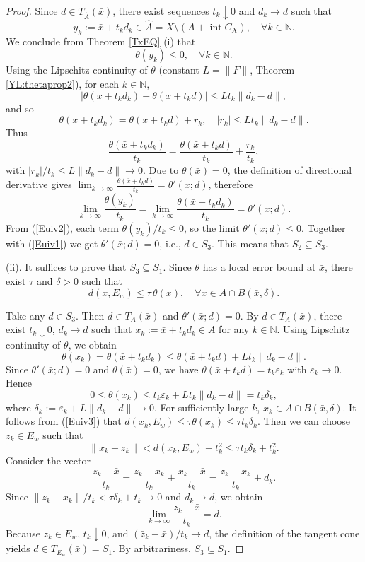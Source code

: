 \documentclass[11pt]{article}
\begin{document}
\begin{proof}
Since $d\in T_{\widehat{A}}(\bar{x})$, there exist sequences $t_k\downarrow0$ and $d_k\to d$ such that
\[
y_k:=\bar{x}+t_k d_k\in\widehat{A}=X\setminus(A+\operatorname{int}C_X), \quad  \forall k \in \mathbb{N}.
\]
    We conclude from  Theorem  \ref{TxEQ} (i)  that
\begin{equation}\label{Euiv2}
\theta(y_k)\le 0,  \quad  \forall k \in \mathbb{N}.
\end{equation}
Using the   Lipschitz continuity of $\theta$ (constant $L=\|F\|$, Theorem \ref{YL:thetaprop2}), for each $k \in \mathbb{N}$,
\[
|\theta(\bar{x}+t_k d_k)-\theta(\bar{x}+t_k d)|\le L t_k\|d_k-d\|,
\]
and so
\[
\theta(\bar{x}+t_k d_k)=\theta(\bar{x}+t_k d)+r_k,\quad |r_k|\le L t_k\|d_k-d\|.
\]
Thus
\[
\frac{\theta(\bar{x}+t_k d_k)}{t_k}=\frac{\theta(\bar{x}+t_k d)}{t_k}+\frac{r_k}{t_k},
\]
with $|r_k|/t_k\le L\|d_k-d\|\to0$.   Due to  $\theta(\bar{x})=0$,   the definition of directional derivative gives $\lim_{k\to\infty}\frac{\theta(\bar{x}+t_k d)}{t_k}=\theta'(\bar{x};d)$, therefore
\[
\lim_{k\to\infty}\frac{\theta(y_k)}{t_k}=\lim_{k\to\infty}\frac{\theta(\bar{x}+t_k d_k)}{t_k}=\theta'(\bar{x};d).
\]
From (\ref{Euiv2}), each term $\theta(y_k)/t_k\le0$, so the limit $\theta'(\bar{x};d)\le0$. Together with (\ref{Euiv1}) we get $\theta'(\bar{x};d)=0$, i.e., $d\in S_3$.  This means that $S_2\subseteq S_3$.

 

(ii).         It suffices to prove  that   $S_3\subseteq S_1$.      Since $\theta$ has a local error bound at   $\bar x$,   there exist $\tau$ and $\delta>0$ such that
\begin{equation}\label{Euiv3}
d(x,E_w)\le \tau\,\theta(x),\quad\forall x\in A\cap B(\bar{x},\delta).
\end{equation}




Take any $d\in S_3$. Then $d\in T_A(\bar{x})$ and $\theta'(\bar{x};d)=0$.
By $d\in T_A(\bar{x})$, there exist $t_k\downarrow0$, $d_k\to d$ such that   $x_k:=\bar{x}+t_k d_k\in A$ for any $k \in \mathbb{N}$.
Using Lipschitz continuity of $\theta$, we obtain
\[
\theta(x_k)=\theta(\bar{x}+t_k d_k)\le\theta(\bar{x}+t_k d)+L t_k\|d_k-d\|.
\]
Since $\theta'(\bar{x};d)=0$ and $\theta(\bar{x})=0$, we have $\theta(\bar{x}+t_k d)=t_k\varepsilon_k$ with $\varepsilon_k\to0$. Hence
\[
0\le\theta(x_k)\le t_k\varepsilon_k+L t_k\|d_k-d\|=t_k\delta_k,
\]
where $\delta_k:=\varepsilon_k+L\|d_k-d\|\to0$.  
For sufficiently large $k$, $x_k\in A\cap B(\bar{x},\delta)$.  It follows from  (\ref{Euiv3})  that
$ d(x_k,E_w)\le\tau\theta(x_k)\le\tau t_k\delta_k.$
Then we can choose $z_k\in E_w$ such that
\[
\|x_k-z_k\|<d(x_k,E_w)+t_k^2\le\tau t_k\delta_k+t_k^2.
\]
Consider the vector
\[
\frac{z_k-\bar{x}}{t_k}= \frac{z_k-x_k}{t_k}+\frac{x_k-\bar{x}}{t_k}= \frac{z_k-x_k}{t_k}+d_k.
\]
Since $\|z_k-x_k\|/t_k<\tau\delta_k+t_k\to0$ and $d_k\to d$, we obtain
\[
\lim_{k\to\infty}\frac{z_k-\bar{x}}{t_k}=d.
\]
Because $z_k\in E_w$, $t_k\downarrow0$, and $(\bar{z}_k-\bar{x})/t_k\to d$, the definition of the tangent cone yields $d\in T_{E_w}(\bar{x})=S_1$. By arbitrariness, $S_3\subseteq S_1$.
 \end{proof}   
\end{document}
